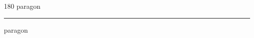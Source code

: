 
\begin{frame}
\begin{center}
\begin{turn}{180}
{\fontsize{2.5cm}{1em}\selectfont paragon}
\end{turn}
\vspace{1em}\par  
\hrule
\vspace{1em}\par  
{\fontsize{2.5cm}{1em}\selectfont paragon}
\end{center}
\end{frame}
